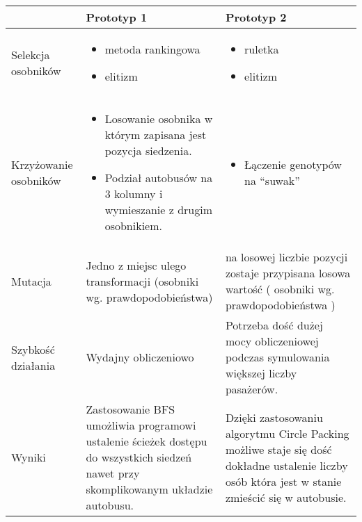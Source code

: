 \documentclass[bibtotocnumbered, headsepline,normalheadings,12pt,polish]{scrreprt}
\begin{document}
\begin{tabular}{| p{3cm} || p{6cm} | p{6cm} |}
\hline
 & Prototyp 1 & Prototyp 2 \\
\hline
\hline
Selekcja osobników &
\begin{itemize}
    \item metoda rankingowa 
    \item elitizm
\end{itemize}
&
\begin{itemize}
    \item ruletka 
    \item elitizm
\end{itemize}
\\
\hline
Krzyżowanie osobników &
\begin{itemize}
\item Losowanie osobnika w którym zapisana jest pozycja siedzenia.
\item Podział autobusów na 3 kolumny i wymieszanie z drugim osobnikiem.
\end{itemize}
&
\begin{itemize}
\item Łączenie genotypów na ``suwak''
\end{itemize}
\\
\hline
Mutacja & Jedno z miejsc ulego transformacji (osobniki wg. prawdopodobieństwa) & na losowej liczbie pozycji zostaje przypisana losowa wartość ( osobniki wg. prawdopodobieństwa ) \\
\hline
Szybkość działania & Wydajny obliczeniowo & Potrzeba dość dużej mocy obliczeniowej podczas symulowania większej liczby pasażerów. \\
\hline
Wyniki & Zastosowanie BFS umożliwia programowi ustalenie ścieżek dostępu do wszystkich siedzeń nawet przy skomplikowanym układzie autobusu. & Dzięki zastosowaniu algorytmu Circle Packing możliwe staje się dość dokładne ustalenie liczby osób która jest w stanie zmieścić się w autobusie. \\
\hline
\end{tabular}
\end{document}
